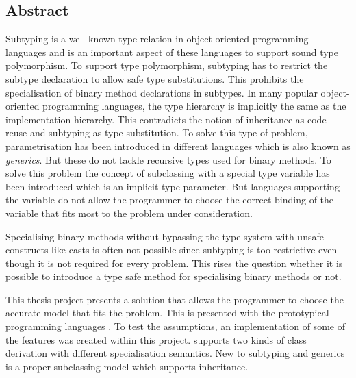 %
%
\subsection*{Abstract}
Subtyping is a well known type relation in object-oriented
programming languages and is an important aspect of these languages
to support sound type polymorphism. To support type polymorphism,
subtyping has to restrict the subtype declaration to allow safe type
substitutions. This prohibits the specialisation of binary method declarations 
in subtypes. In many popular object-oriented programming languages, the type
hierarchy is implicitly the same as the implementation hierarchy. This
contradicts the notion of inheritance as code reuse and subtyping as type
substitution. To solve this type of problem, parametrisation has been introduced in
different languages which is also known as \emph{generics}. But these do not
tackle recursive types used for binary methods. To solve this problem
the concept of subclassing with a special type variable \mytype has been
introduced which is an implicit type parameter. But languages supporting
the \mytype variable do not allow the programmer to choose the correct
binding of the variable that fits most to the problem under consideration.

Specialising binary methods without bypassing the type system with
unsafe constructs like casts is often not possible since subtyping is
too restrictive even though it is not required for every problem. This
rises the question whether it is possible to introduce a type safe method
for specialising binary methods or not.

This thesis project presents a solution that allows the programmer to
choose the accurate model that fits the problem. This is presented
with the prototypical programming languages \ooplss. To test the
assumptions, an implementation of some of the features was created
within this project. \ooplss supports two kinds of class derivation
with different specialisation semantics. New to subtyping and generics
is a proper subclassing model which supports inheritance.

